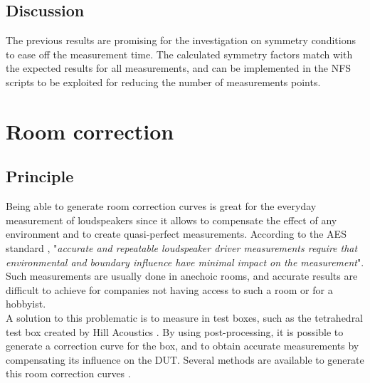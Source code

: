 \documentclass{report}
\begin{document}
\section{Discussion}

The previous results are promising for the investigation on symmetry conditions to ease off the measurement time. The calculated symmetry factors match with the expected results for all measurements, and can be implemented in the NFS scripts to be exploited for reducing the number of measurements points. 



\chapter{Room correction}

\section{Principle}

Being able to generate room correction curves is great for the everyday measurement of loudspeakers since it allows to compensate the effect of any environment and to create quasi-perfect measurements. According to the AES standard \cite{aesstandart}, "\textit{accurate and repeatable loudspeaker driver measurements require that environmental and boundary influence have minimal impact on the measurement}". Such measurements are usually done in anechoic rooms, and accurate results are difficult to achieve for companies not having access to such a room or for a hobbyist. \\

A solution to this problematic is to measure in test boxes, such as the tetrahedral test box created by Hill Acoustics \citep[see][]{tetbox}. By using post-processing, it is possible to generate a correction curve for the box, and to obtain accurate measurements by compensating its influence on the DUT. Several methods are available to generate this room correction curves \citep[see][]{aeswb}.\\
\end{document}
